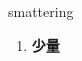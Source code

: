 
\begin{frame}
{\huge smattering}
\begin{center}
\begin{enumerate}\Large
  \item \textbf{少量}
\end{enumerate}
\end{center}
\end{frame}

